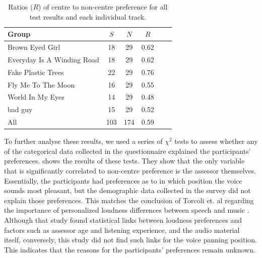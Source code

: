 \documentclass[fleqn]{jaes}
\begin{document}
\begin{table}[h!]
\centering
\caption{Ratios ($R$) of centre to non-centre preference for all test results and each individual track.}
\begin{tabular}{lccccc}
\toprule
Group & $S$ & $N$ & $R$ \\
\midrule
Brown Eyed Girl & 18 & 29 & \num{0.62} \\
Everyday Is A Winding Road & 18 & 29 & \num{0.62} \\
Fake Plastic Trees & 22 & 29 & \num{0.76} \\
Fly Me To The Moon & 16 & 29 & \num{0.55} \\
World In My Eyes & 14 & 29 & \num{0.48} \\
bad guy & 15 & 29 & \num{0.52} \\
All & 103 & 174 & \num{0.59} \\
\bottomrule
\end{tabular}

\label{table:ratios}
\end{table}

To further analyse these results, we used a series of $\chi^2$ tests to assess whether any of the categorical data collected in the questionnaire explained the participants' preferences.  shows the results of these tests. They show that the only variable that is significantly correlated to non-centre preference is the assessor themselves. Essentially, the participants had preferences as to in which position the voice sounds most pleasant, but the demographic data collected in the survey did not explain those preferences. This matches the conclusion of Torcoli et. al regarding the importance of personalized loudness differences between speech and music  \cite{torcoliPreferredLevelsBackground2019}. Although that study found statistical links between loudness preferences and factors such as assessor age and listening experience, and the audio material itself, conversely, this study did not find such links for the voice panning position. This indicates that the reasons for the participants' preferences remain unknown.
\end{document}
